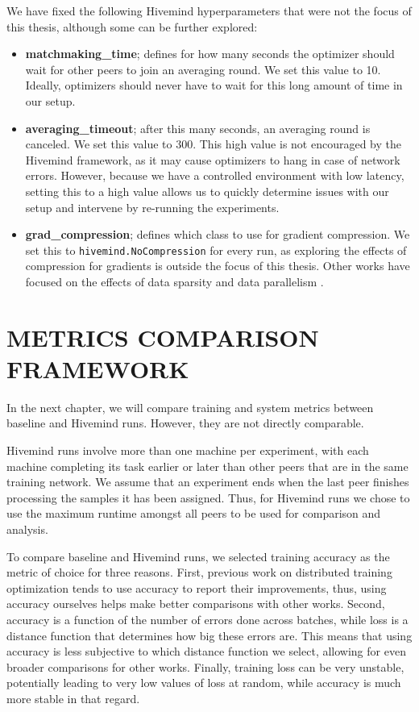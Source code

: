 We have fixed the following Hivemind hyperparameters that were not the focus of this thesis, although some can be further explored:
\begin{itemize}
    \item \textbf{matchmaking\_time}; defines for how many seconds the optimizer should wait for other peers to join an averaging round.
          We set this value to 10.
          Ideally, optimizers should never have to wait for this long amount of time in our setup.
    \item \textbf{averaging\_timeout}; after this many seconds, an averaging round is canceled.
          We set this value to 300.
          This high value is not encouraged by the Hivemind framework, as it may cause optimizers to hang in case of network errors.
          However, because we have a controlled environment with low latency, setting this to a high value allows us to quickly determine issues with our setup and intervene by re-running the experiments.
    \item \textbf{grad\_compression}; defines which class to use for gradient compression.
          We set this to \texttt{hivemind.NoCompression} for every run, as exploring the effects of compression for gradients is outside the focus of this thesis.
          Other works have focused on the effects of data sparsity and data parallelism \cite{DBLP:journals/corr/abs-2003-11316}.
\end{itemize}

\section{METRICS COMPARISON FRAMEWORK}

In the next chapter, we will compare training and system metrics between baseline and Hivemind runs.
However, they are not directly comparable.

Hivemind runs involve more than one machine per experiment, with each machine completing its task earlier or later than other peers that are in the same training network.
We assume that an experiment ends when the last peer finishes processing the samples it has been assigned.
Thus, for Hivemind runs we chose to use the maximum runtime amongst all peers to be used for comparison and analysis.

To compare baseline and Hivemind runs, we selected training accuracy as the metric of choice for three reasons.
First, previous work on distributed training optimization tends to use accuracy to report their improvements, thus, using accuracy ourselves helps make better comparisons with other works.
Second, accuracy is a function of the number of errors done across batches, while loss is a distance function that determines how big these errors are.
This means that using accuracy is less subjective to which distance function we select, allowing for even broader comparisons for other works.
Finally, training loss can be very unstable, potentially leading to very low values of loss at random, while accuracy is much more stable in that regard.

